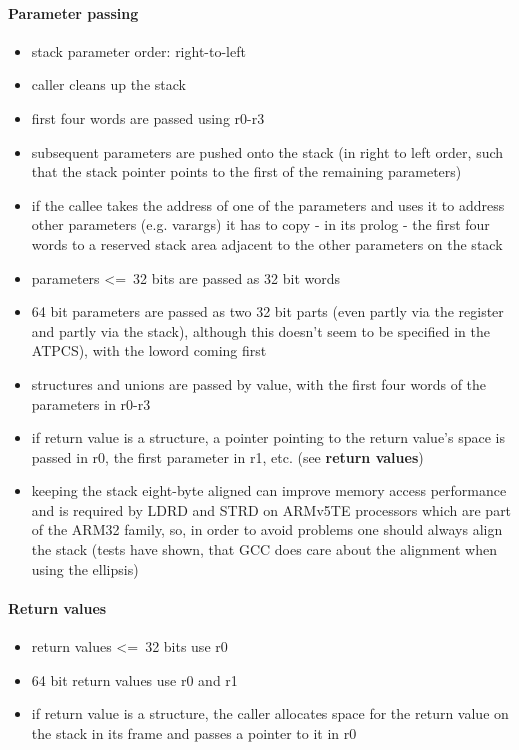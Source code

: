 \paragraph{Parameter passing}

\begin{itemize}
\item stack parameter order: right-to-left
\item caller cleans up the stack
\item first four words are passed using r0-r3
\item subsequent parameters are pushed onto the stack (in right to left order, such that the stack pointer points to the first of the remaining parameters)
\item if the callee takes the address of one of the parameters and uses it to address other parameters (e.g. varargs) it has to copy - in its prolog - the first four words to a reserved stack area adjacent to the other parameters on the stack
\item parameters \textless=\ 32 bits are passed as 32 bit words
\item 64 bit parameters are passed as two 32 bit parts (even partly via the register and partly via the stack), although this doesn't seem to be specified in the ATPCS), with the loword coming first
\item structures and unions are passed by value, with the first four words of the parameters in r0-r3
\item if return value is a structure, a pointer pointing to the return value's space is passed in r0, the first parameter in r1, etc. (see {\bf return values})
\item keeping the stack eight-byte aligned can improve memory access performance and is required by LDRD and STRD on ARMv5TE processors which are part of the ARM32 family, so, in order to avoid problems one should always align the stack (tests have shown, that GCC does care about the alignment when using the ellipsis)
\end{itemize}


\paragraph{Return values}
\begin{itemize}
\item return values \textless=\ 32 bits use r0
\item 64 bit return values use r0 and r1
\item if return value is a structure, the caller allocates space for the return value on the stack in its frame and passes a pointer to it in r0
\end{itemize}

